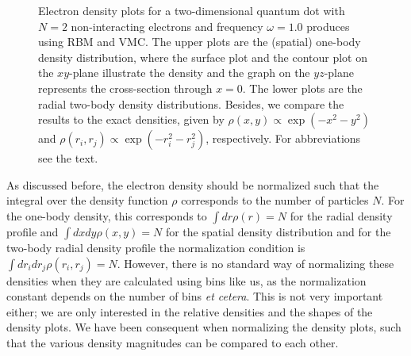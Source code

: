\begin{figure}
	\hspace{0.1cm}
	
	\caption{Electron density plots for a two-dimensional quantum dot with $N=2$ non-interacting electrons and frequency $\omega=1.0$ produces using RBM and VMC. The upper plots are the (spatial) one-body density distribution, where the surface plot and the contour plot on the $xy$-plane illustrate the density and the graph on the $yz$-plane represents the cross-section through $x=0$. The lower plots are the radial two-body density distributions. Besides, we compare the results to the exact densities, given by $\rho(x,y)\propto\exp(-x^2-y^2)$ and $\rho(r_i,r_j)\propto\exp(-r_i^2-r_j^2)$, respectively. For abbreviations see the text.}
	\label{fig:ED_nointeraction}
\end{figure}

As discussed before, the electron density should be normalized such that the integral over the density function $\rho$ corresponds to the number of particles $N$. For the one-body density, this corresponds to $\int dr\rho(r)=N$ for the radial density profile and $\int dxdy\rho(x,y)=N$ for the spatial density distribution and for the two-body radial density profile the normalization condition is $\int dr_idr_j\rho(r_i,r_j)=N$. However, there is no standard way of normalizing these densities when they are calculated using bins like us, as the normalization constant depends on the number of bins \textit{et cetera}. This is not very important either; we are only interested in the relative densities and the shapes of the density plots. We have been consequent when normalizing the density plots, such that the various density magnitudes can be compared to each other.

